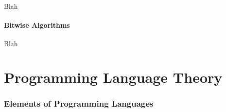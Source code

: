 Blah


\subsection{Bitwise Algorithms}


Blah

\newpage


\part*{Programming Language Theory}




\toclineskip
\section{Elements of Programming Languages}



